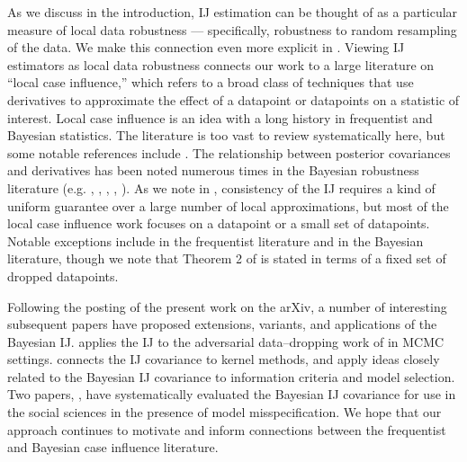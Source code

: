 As we discuss in the introduction, IJ estimation can be thought of as a
particular measure of local data robustness --- specifically, robustness to
random resampling of the data. We make this connection even more explicit in
. Viewing IJ estimators as local data robustness
connects our work to a large literature on ``local case influence,'' which
refers to a broad class of techniques that use derivatives to approximate the
effect of a datapoint or datapoints on a statistic of interest.  Local case
influence is an idea with a long history in frequentist and Bayesian statistics.
The literature is too vast to review systematically here, but some notable
references include
\citet{belsley:1980:regression,cook:1977:detectionofinfluential,
cook:1982:residualsandinfluenceinregression, cook:1986:assessment,
kempthorne:1986:decision,kass:1989:approximatebayesiansensitivity,
carlin:1991:expectedutilityinfluence,
zhu:2007:perturbation,koh:2017:blackboxinfluence,
thomas:2018:reconcilingcurvatureandis}.
The relationship between posterior covariances and derivatives has been noted
numerous times in the Bayesian robustness literature (e.g.
\citet{diaconis:1986:bayesconsistency}, \citet{gustafson:1996:localposterior},
\citet{basu:1996:local}, \citet{efron:2015:frequentist},
\citet{giordano:2018:covariances}). As we note in ,
consistency of the IJ requires a kind of uniform guarantee over a large number
of local approximations, but most of the local case influence work focuses on a
datapoint or a small set of datapoints. Notable exceptions include
\citet{giordano:2019:swiss} in the frequentist literature and
\citet{zhu:2012:bayesiancaseinfluence} in the Bayesian literature, though we
note that Theorem 2 of \citet{zhu:2012:bayesiancaseinfluence} is stated in terms
of a fixed set of dropped datapoints.

Following the posting of the present work on the arXiv, a number of interesting
subsequent papers have proposed extensions, variants, and applications of the
Bayesian IJ.  applies
the IJ to the adversarial data--dropping work of
\citet{giordano:2026:amip1,giordano:2026:amip2} in MCMC settings.
 connects the IJ covariance to kernel methods, and
\citet{iba:2023:posteriorweighted} apply ideas closely related to the Bayesian
IJ covariance to information criteria and model selection.  Two papers,
\textcite{ji:2025:ValidStandardErrors2025,luo:2026:RobustStandardErrors2026},
have systematically evaluated the Bayesian IJ covariance for use in the social
sciences in the presence of model misspecification. We hope that our approach
continues to motivate and inform connections between the frequentist and
Bayesian case influence literature.




